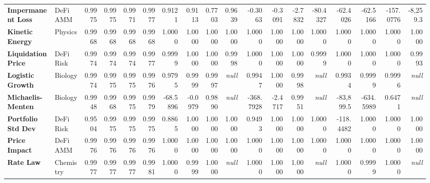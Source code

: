 \documentclass[11pt]{article}
\begin{document}
\begin{landscape}
\begin{adjustbox}{width=\linewidth,center}
\begin{tabular}{l l *{4}{r} *{4}{r} *{4}{r} *{4}{r}}
\textbf{Impermanent Loss} & DeFi AMM & 0.9975 & 0.9975 & \cellcolor{match}0.9971 & \cellcolor{match}0.9977 & 0.9121 & 0.9113 & \cellcolor{minor}0.7703 & \cellcolor{minor}0.9639 & -0.3063 & -0.3091 & \cellcolor{major}-2.7832 & \cellcolor{major}-80.4327 & -62.4026 & -62.5166 & \cellcolor{major}-157.0776 & \cellcolor{major}-8{,}259.3 \\
\textbf{Kinetic Energy} & Physics & 0.9968 & 0.9968 & \cellcolor{match}0.9968 & \cellcolor{match}0.9968 & 1.0000 & 1.0000 & \cellcolor{match}1.0000 & \cellcolor{match}1.0000 & 1.0000 & 1.0000 & \cellcolor{match}1.0000 & \cellcolor{match}1.0000 & 1.0000 & 1.0000 & \cellcolor{match}1.0000 & \cellcolor{match}1.0000 \\
\textbf{Liquidation Price} & DeFi Risk & 0.9974 & 0.9974 & \cellcolor{match}0.9974 & \cellcolor{match}0.9977 & 0.9999 & 1.0000 & \cellcolor{match}1.0000 & \cellcolor{match}0.9998 & 1.0000 & 1.0000 & \cellcolor{match}1.0000 & \cellcolor{match}0.9999 & 1.0000 & 1.0000 & \cellcolor{match}1.0000 & \cellcolor{match}0.9993 \\
\textbf{Logistic Growth} & Biology & 0.9974 & 0.9975 & \cellcolor{match}0.9975 & \cellcolor{match}0.9976 & 0.9795 & 0.9999 & \cellcolor{minor}0.9997 & \cellcolor{major}\textit{null} & 0.9947 & 1.0000 & \cellcolor{match}0.9998 & \cellcolor{major}\textit{null} & 0.9934 & 0.9999 & \cellcolor{match}0.9996 & \cellcolor{major}\textit{null} \\
\textbf{Michaelis-Menten} & Biology & 0.9948 & 0.9968 & \cellcolor{match}0.9975 & \cellcolor{match}0.9979 & -68.5896 & -0.0979 & \cellcolor{major}0.9890 & \cellcolor{major}\textit{null} & -368.7928 & -2.4717 & \cellcolor{major}0.9951 & \cellcolor{major}\textit{null} & -83{,}899.5 & -634.5989 & \cellcolor{major}0.6471 & \cellcolor{major}\textit{null} \\
\textbf{Portfolio Std Dev} & DeFi Risk & 0.9504 & 0.9975 & \cellcolor{minor}0.9975 & \cellcolor{match}0.9975 & 0.8865 & 1.0000 & \cellcolor{minor}1.0000 & \cellcolor{match}1.0000 & 0.9493 & 1.0000 & \cellcolor{minor}1.0000 & \cellcolor{match}1.0000 & -118.4482 & 1.0000 & \cellcolor{major}1.0000 & \cellcolor{match}1.0000 \\
\textbf{Price Impact} & DeFi AMM & 0.9976 & 0.9976 & \cellcolor{match}0.9976 & \cellcolor{match}0.9976 & 1.0000 & 1.0000 & \cellcolor{match}1.0000 & \cellcolor{match}1.0000 & 1.0000 & 1.0000 & \cellcolor{match}1.0000 & \cellcolor{match}1.0000 & 1.0000 & 1.0000 & \cellcolor{match}1.0000 & \cellcolor{match}1.0000 \\
\textbf{Rate Law} & Chemistry & 0.9977 & 0.9977 & \cellcolor{match}0.9977 & \cellcolor{match}0.9981 & 1.0000 & 0.9999 & \cellcolor{match}1.0000 & \cellcolor{major}\textit{null} & 1.0000 & 1.0000 & \cellcolor{match}1.0000 & \cellcolor{major}\textit{null} & 1.0000 & 0.9999 & \cellcolor{match}1.0000 & \cellcolor{major}\textit{null} \\

\end{tabular}
\end{adjustbox}
\end{landscape}
\end{document}
